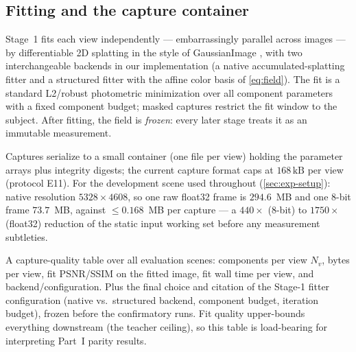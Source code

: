 \subsection{Fitting and the capture container}
\label{sec:fitting}

Stage~1 fits each view independently --- embarrassingly parallel across images --- by
differentiable 2D splatting in the style of GaussianImage \citep{zhang2024_gaussianimage},
with two interchangeable backends in our implementation (a native accumulated-splatting fitter
and a structured fitter with the affine color basis of \cref{eq:field}).  The fit is a
standard L2/robust photometric minimization over all component parameters with a fixed
component budget; masked captures restrict the fit window to the subject.  After fitting, the
field is \emph{frozen}: every later stage treats it as an immutable measurement.

Captures serialize to a small container (one file per view) holding the parameter arrays plus
integrity digests; the current capture format caps at
$168\,\mathrm{kB}$ per view (protocol E11).
For the development scene used throughout (\cref{sec:exp-setup}): native resolution
$5328 \times 4608$, so one raw float32 frame is $294.6$~MB and one 8-bit frame $73.7$~MB,
against $\le 0.168$~MB per capture --- a $440\times$ (8-bit) to $1750\times$ (float32)
reduction of the static input working set before any measurement subtleties.

\begin{ToShowBlock}
A capture-quality table over all evaluation scenes: components per view $N_v$, bytes per view,
fit PSNR/SSIM on the fitted image, fit wall time per view, and backend/configuration.  Plus
the final choice and citation of the Stage-1 fitter configuration (native vs.\ structured
backend, component budget, iteration budget), frozen before the confirmatory runs.  Fit
quality upper-bounds everything downstream (the teacher ceiling), so this table is
load-bearing for interpreting Part~I parity results.
\end{ToShowBlock}

\begin{figure}[t]
  \centering
  \caption{}
  \label{fig:capture}
\end{figure}

